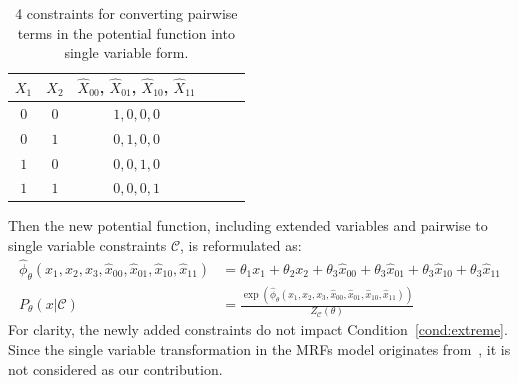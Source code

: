 \begin{table}
    \centering
    \begin{tabular}{cc|cccc}
        \hline
        $X_1$ & $X_2$ & $\hat{X}_{00}$, $\hat{X}_{01}$, $\hat{X}_{10}$, $\hat{X}_{11}$ \\ \hline
        $0$   & $0$   & $1, 0, 0, 0$                                                   \\
        $0$   & $1$   & $0, 1, 0, 0$                                                   \\
        $1$   & $0$   & $0, 0, 1, 0$                                                   \\
        $1$   & $1$   & $0, 0, 0, 1$                                                   \\
        \hline
    \end{tabular}
    \caption{4 constraints for converting pairwise terms in the potential function into single variable form.}
    \label{tab:pairwise-to-single}
\end{table}
Then the new potential function, including extended variables and pairwise to single variable constraints $\mathcal{C}$, is reformulated as:
\begin{align*}
    \hat{\phi}_{\theta}(x_1,x_2,x_3,\hat{x}_{00},\hat{x}_{01},\hat{x}_{10},\hat{x}_{11}) & =\theta_1 x_1+\theta_2 x_2+\theta_3 \hat{x}_{00}+ \theta_3 \hat{x}_{01}+\theta_3 \hat{x}_{10}+\theta_3 \hat{x}_{11}         \\
    P_{\theta}(x|\mathcal{C})                                                            & =\frac{\exp(\hat{\phi}_{\theta}(x_1,x_2,x_3,\hat{x}_{00},\hat{x}_{01},\hat{x}_{10},\hat{x}_{11}))}{Z_{\mathcal{C}}(\theta)}
\end{align*}
For clarity, the newly added constraints do not impact Condition~\ref{cond:extreme}. Since the single variable transformation in the MRFs model originates from~\citep{Sang2005}, it is not considered as our contribution.


